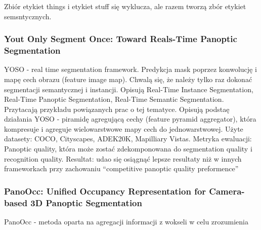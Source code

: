 \documentclass[
]{article}
\begin{document}
Zbiór etykiet things i etykiet stuff się wyklucza, ale razem tworzą zbór etykiet semsntycznych.

\subsubsection{Yout Only Segment Once: Toward Reals-Time Panoptic Segmentation}\label{yout-only-segment-once-toward-reals-time-panoptic-segmentation}

YOSO - real time segmentation framework. Predykcja mask poprzez konwolucję i mapę cech obrazu (feature image map). Chwalą się, że należy tylko raz dokonać segmentacji semantycznej i instancji.
Opisują Real-Time Instance Segmentation, Real-Time Panoptic Segmentation, Real-Time Semantic Segmentation. Przytacają przykładu powiązanych prac o tej tematyce.
Opisują podstaę działania YOSO - piramidę agregującą cechy (feature pyramid aggregator), która kompresuje i agreguje wielowarstwowe mapy cech do jednowarstwowej.
Użyte datasety: COCO, Cityscapes, ADEK20K, Mapilliary Vistas.
Metryka ewaluacji: Panoptic quality, która może zostać zdekomponowana do segmentation quality i recognition quality.
Resultat: udao się osiągnąć lepsze resultaty niż w innych frameworkach przy zachowaniu ``competitive panoptic quality preformence''

\subsubsection{PanoOcc: Unified Occupancy Representation for Camera-based 3D Panoptic Segmentation}\label{panoocc-unified-occupancy-representation-for-camera-based-3d-panoptic-segmentation}

PanoOcc - metoda oparta na agregacji informacji z wokseli w celu zrozumienia
\end{document}

